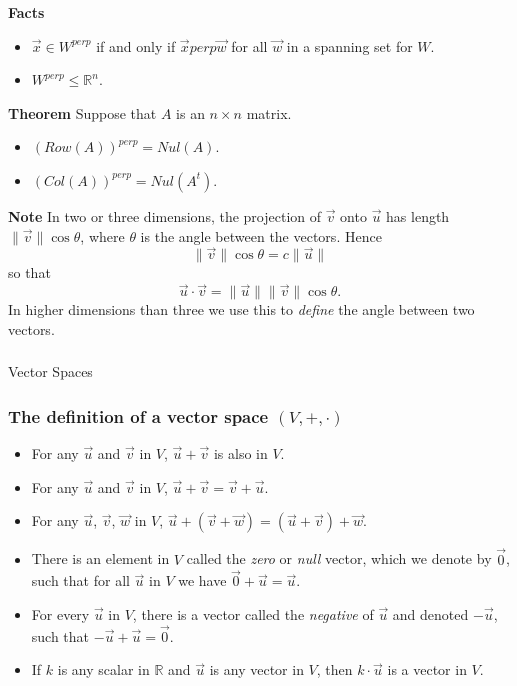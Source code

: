  \begin{frame}[fragile]
\textbf{Facts}
\begin{itemize}
 \item $\vec{x}\in W^{perp}$ if and only if $\vec{x}perp \vec{w}$ for all $\vec{w}$ in a spanning set for $W$.
 \item  $W^{perp}\le \mathbb R^n$.
\end{itemize}


\textbf{Theorem}
Suppose that $A$ is an $n\times n$ matrix.
\begin{itemize}
 \item $(Row(A))^{perp} = Nul(A)$.
 \item $(Col(A))^{perp}=Nul(A^t)$.
\end{itemize}

\end{frame}





 \begin{frame}[fragile]
\textbf{Note}
In two or three dimensions, the projection of $\vec{v}$ onto $\vec{u}$
has length $\| \vec{v} \| \cos \theta$, where $\theta$ is the angle between
the vectors.  Hence
\[
\| \vec{v} \| \cos \theta = c \| \vec{u} \|
\]
so that 
\[
\vec{u}\cdot\vec{v} = \| \vec{u} \| \| \vec{v} \| \cos \theta.
\]
In higher dimensions than three we use this to {\em define} the angle between two vectors.

\end{frame}



\begin{frame}[fragile]\frametitle{}
\begin{center}
{\Large Vector Spaces }
\end{center}
\end{frame}



\begin{frame}[fragile]
\frametitle{The definition of a vector space $(V, +, \cdot)$}
\begin{itemize}
\item For any $\vec{u}$ and $\vec{v}$ in $V$, $\vec{u} + \vec{v}$ is also in $V$.
\item For any $\vec{u}$ and $\vec{v}$ in $V$, $\vec{u} + \vec{v} = \vec{v} + \vec{u}$.
\item For any $\vec{u}$, $\vec{v}$, $\vec{w}$ in $V$, $\vec{u} + (\vec{v} + \vec{w}) = (\vec{u} + \vec{v}) + \vec{w}$.
\item There is an element in $V$ called the {\em zero} or {\em null} vector, 
which we denote by $\vec{0}$, such that for all $\vec{u}$ in $V$ we have $\vec{0} + \vec{u} = \vec{u}$. 
\item For every $\vec{u}$ in $V$, there is a vector called the {\em negative} of $\vec{u}$ and denoted $ - \vec{u}$, such that $ - \vec{u} + \vec{u} = \vec{0}$.
\item If $k$ is any scalar in $\mathbb{R}$ and $\vec{u}$ is any vector in $V$, then $k \cdot \vec{u}$ is a vector in $V$.
\end{itemize}
\end{frame}

